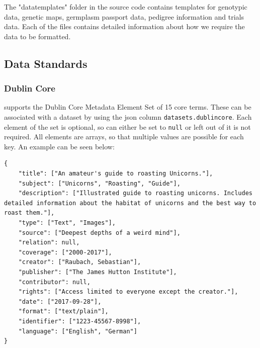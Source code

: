 The "datatemplates" folder in the {\germinate} source code contains templates for genotypic data, genetic maps, germplasm passport data, pedigree information and trials data. Each of the files contains detailed information about how we require the data to be formatted.


\subsection{Data Standards}
\subsubsection{Dublin Core}
{\germinate} supports the Dublin Core Metadata Element Set \cite{DublinCore} of 15 core terms. These can be associated with a dataset by using the json column \texttt{datasets.dublin\textunderscore core}. Each element of the set is optional, so can either be set to \texttt{null} or left out of it is not required. All elements are arrays, so that multiple values are possible for each key. An example can be seen below:

\begin{lstlisting}[style=JavaScript]
{
	"title": ["An amateur's guide to roasting Unicorns."],
	"subject": ["Unicorns", "Roasting", "Guide"],
	"description": ["Illustrated guide to roasting unicorns. Includes detailed information about the habitat of unicorns and the best way to roast them."],
	"type": ["Text", "Images"],
	"source": ["Deepest depths of a weird mind"],
	"relation": null,
	"coverage": ["2000-2017"],
	"creator": ["Raubach, Sebastian"],
	"publisher": ["The James Hutton Institute"],
	"contributor": null,
	"rights": ["Access limited to everyone except the creator."],
	"date": ["2017-09-28"],
	"format": ["text/plain"],
	"identifier": ["1223-45567-8998"],
	"language": ["English", "German"]
}
\end{lstlisting}